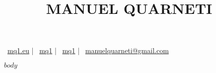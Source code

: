 \documentclass{article}
\title{\vspace{-50pt}\Huge \bfseries MANUEL QUARNETI\vspace{-50pt}}
\author{}
\date{}
\begin{document}
  \maketitle

  \begin{center}
    \faGlobe \ \href{https://mq1.eu/}{mq1.eu} |
    \faGithub \ \href{https://github.com/mq1/}{mq1} |
    \faLinkedin \ \href{https://linkedin.com/in/mq1/}{mq1} |
    \faEnvelope \ \href{mailto:manuelquarneti@gmail.com}{manuelquarneti@gmail.com}
  \end{center}

  $body$
\end{document}
